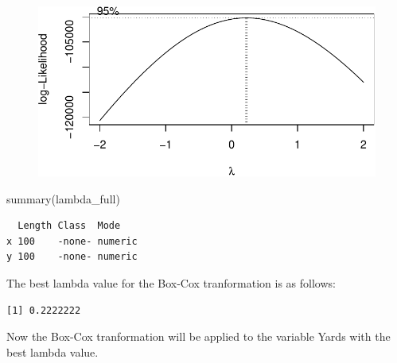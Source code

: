 \documentclass[
  super,
  preprint,
  3p]{elsarticle}
\newenvironment{Shaded}{\begin{snugshade}}{\end{snugshade}}
\newcommand{\FunctionTok}[1]{\textcolor[rgb]{0.28,0.35,0.67}{#1}}
\newcommand{\NormalTok}[1]{\textcolor[rgb]{0.00,0.23,0.31}{#1}}
\newcommand{\SpecialCharTok}[1]{\textcolor[rgb]{0.37,0.37,0.37}{#1}}
\begin{document}
\begin{figure}[H]

{\centering \includegraphics{project_report_files/figure-pdf/unnamed-chunk-29-1.pdf}

}

\end{figure}

\begin{Shaded}
\begin{Highlighting}[]
\FunctionTok{summary}\NormalTok{(lambda\_full)}
\end{Highlighting}
\end{Shaded}

\begin{verbatim}
  Length Class  Mode   
x 100    -none- numeric
y 100    -none- numeric
\end{verbatim}

The best lambda value for the Box-Cox tranformation is as follows:

\begin{Shaded}
\end{Shaded}

\begin{verbatim}
[1] 0.2222222
\end{verbatim}

Now the Box-Cox tranformation will be applied to the variable Yards with
the best lambda value.
\end{document}
